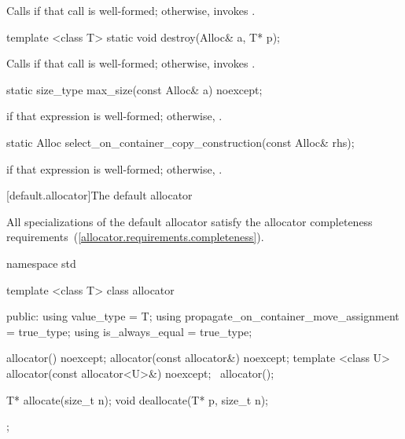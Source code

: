 \begin{itemdescr}
\pnum
\effects Calls 
if that call is well-formed;
otherwise, invokes .
\end{itemdescr}

%
\begin{itemdecl}
template <class T>
  static void destroy(Alloc& a, T* p);
\end{itemdecl}

\begin{itemdescr}
\pnum
\effects Calls  if that call is well-formed; otherwise, invokes
.
\end{itemdescr}

%
\begin{itemdecl}
static size_type max_size(const Alloc& a) noexcept;
\end{itemdecl}

\begin{itemdescr}
\pnum
\returns {} if that expression is well-formed; otherwise,
.
\end{itemdescr}

%
\begin{itemdecl}
static Alloc select_on_container_copy_construction(const Alloc& rhs);
\end{itemdecl}

\begin{itemdescr}
\pnum
\returns {} if that expression is
well-formed; otherwise, .
\end{itemdescr}

[default.allocator]{The default allocator}

\pnum
All specializations of the default allocator satisfy the
allocator completeness requirements~(\ref{allocator.requirements.completeness}).

%
\begin{codeblock}
namespace std {
  template <class T> class allocator {
   public:
    using value_type      = T;
    using propagate_on_container_move_assignment = true_type;
    using is_always_equal = true_type;

    allocator() noexcept;
    allocator(const allocator&) noexcept;
    template <class U> allocator(const allocator<U>&) noexcept;
    ~allocator();

    T* allocate(size_t n);
    void deallocate(T* p, size_t n);
  };
}
\end{codeblock}


